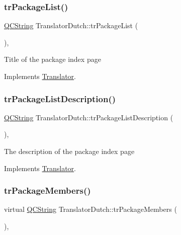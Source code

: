 \subsubsection{\texorpdfstring{trPackageList()}{trPackageList()}}
{\footnotesize\ttfamily \mbox{\hyperlink{class_q_c_string}{Q\+C\+String}} Translator\+Dutch\+::tr\+Package\+List (\begin{DoxyParamCaption}{ }\end{DoxyParamCaption})\hspace{0.3cm}{\ttfamily [inline]}, {\ttfamily [virtual]}}

Title of the package index page 

Implements \mbox{\hyperlink{class_translator}{Translator}}.

\mbox{\label{class_translator_dutch_a498b5392e984f25b4caf489883159ea9}} 
\subsubsection{\texorpdfstring{trPackageListDescription()}{trPackageListDescription()}}
{\footnotesize\ttfamily \mbox{\hyperlink{class_q_c_string}{Q\+C\+String}} Translator\+Dutch\+::tr\+Package\+List\+Description (\begin{DoxyParamCaption}{ }\end{DoxyParamCaption})\hspace{0.3cm}{\ttfamily [inline]}, {\ttfamily [virtual]}}

The description of the package index page 

Implements \mbox{\hyperlink{class_translator}{Translator}}.

\mbox{\label{class_translator_dutch_a39ecb988a8180c47c0c045c1bf19950d}} 
\subsubsection{\texorpdfstring{trPackageMembers()}{trPackageMembers()}}
{\footnotesize\ttfamily virtual \mbox{\hyperlink{class_q_c_string}{Q\+C\+String}} Translator\+Dutch\+::tr\+Package\+Members (\begin{DoxyParamCaption}{ }\end{DoxyParamCaption})\hspace{0.3cm}{\ttfamily [inline]}, {\ttfamily [virtual]}}

